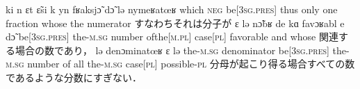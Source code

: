\documentclass{ltjsarticle}
\newcommand\liaison{\hspace*{0.1em}\raisebox{-0.8ex}{\rotatebox{90}{(}}\hspace*{0.1em}}
\begin{document}
         {ki n {ɛt{\liaison}} \~{ɛ}si {k{\liaison}} yn fʁaksj\~{ɔ} d\~{ɔ} lə {nymeʁatœʁ\liaison}}
         {which \textsc{neg} {be[3\textsc{sg}.\textsc{pres}]} thus only one fraction whose the numerator}
         {すなわちそれは分子が}
         {ɛ lə n\~{ɔ}bʁ de kɑ favɔʁabl e d\~{ɔ}}
         {{be[3\textsc{sg}.\textsc{pres}]} the-\textsc{m}.\textsc{sg} number {of{\textunderscore}the[\textsc{m}.\textsc{pl}]} {case[\textsc{pl}]} favorable and whose}
         {関連する場合の数であり，}
         {lə {denɔminatœʁ\liaison} ɛ lə}
         {the-\textsc{m}.\textsc{sg} denominator {be[3\textsc{sg}.\textsc{pres}]} the-\textsc{m}.\textsc{sg} number of all the-\textsc{m}.\textsc{sg} case[\textsc{pl}] possible-\textsc{pl}}
         {分母が起こり得る場合すべての数であるような分数にすぎない．}
\end{document}
